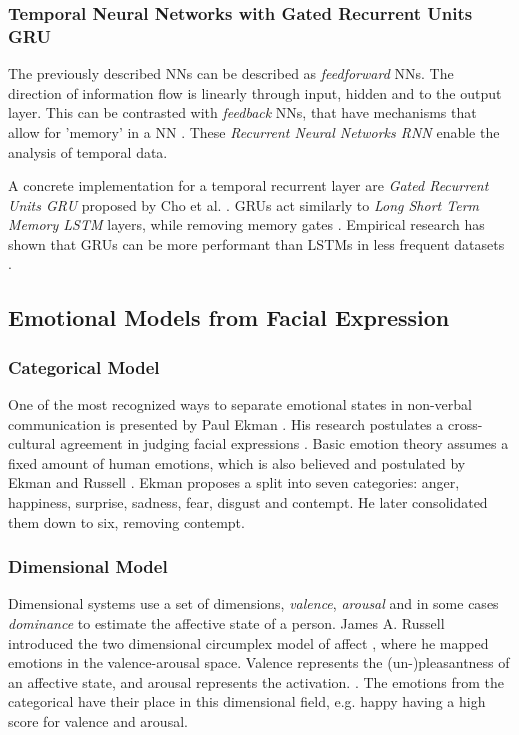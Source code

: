 \subsubsection{Temporal Neural Networks with Gated Recurrent Units GRU}
The previously described NNs can be described as \emph{feedforward} NNs. The direction of information flow is linearly through input, hidden and to the output layer. This can be contrasted with \emph{feedback} NNs, that have mechanisms that allow for 'memory' in a NN \cite{wang2003artificial}. These \emph{Recurrent Neural Networks RNN} enable the analysis of temporal data.

A concrete implementation for a temporal recurrent layer are \emph{Gated Recurrent Units GRU} proposed by Cho et al. \cite{cho2014properties} \cite{chung2014empirical}. GRUs act similarly to \emph{Long Short Term Memory LSTM} \cite{hochreiter1997lstm} layers, while removing memory gates \cite{chung2014empirical}. Empirical research has shown that GRUs can be more performant than LSTMs in less frequent datasets \cite{gruber2020gru}.

\subsection{Emotional Models from Facial Expression}
\label{sub:rw_fer}
\subsubsection{Categorical Model}
One of the most recognized ways to separate emotional states in non-verbal communication is presented by Paul Ekman \cite{ekman1987universals} \cite{ekman2013emotion}. His research postulates a cross-cultural agreement in judging facial expressions \cite{ekman1987universals}. Basic emotion theory assumes a fixed amount of human emotions, which is also believed and postulated by Ekman and Russell \cite{ekman1992basic} \cite{russell2006}. Ekman proposes a split into seven categories: anger, happiness, surprise, sadness, fear, disgust and contempt. He later consolidated them down to six, removing contempt. 

\subsubsection{Dimensional Model}

Dimensional systems use a set of dimensions, \emph{valence}, \emph{arousal} and in some cases \emph{dominance} to estimate the affective state of a person. James A. Russell introduced the two dimensional circumplex model of affect \cite{russell1980circumplex}, where he mapped emotions in the valence-arousal space. Valence represents the (un-)pleasantness of an affective state, and arousal represents the activation. \cite{posner2005circumplex}. The emotions from the categorical have their place in this dimensional field, e.g. happy having a high score for valence and arousal.

